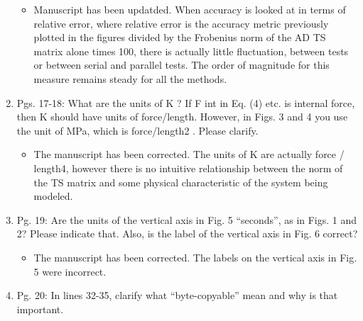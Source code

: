 \documentclass{article}
\begin{document}
\begin{enumerate}
{\color{red}  
\begin{itemize}
     \item
     	Manuscript has been updatded. When accuracy is looked at in terms of relative error, where relative error is the accuracy metric previously plotted in the figures divided by the Frobenius norm of the AD TS matrix alone times 100, there is actually little fluctuation, between tests or between serial and parallel tests. The order of magnitude for this measure remains steady for all the methods.
  \end{itemize}}

  \item
    Pgs. 17-18: What are the units of K ? If F int in Eq. (4) etc. is internal force, then K
    should have units of force/length. However, in Figs. 3 and 4 you use the unit of
    MPa, which is force/length2 . Please clarify.

{\color{red}  
\begin{itemize}
     \item
    The manuscript has been corrected. The units of K are actually force / length4, however there is no intuitive relationship between the norm of the TS matrix and some physical characteristic of the system being modeled.
  \end{itemize}}

    \item
        Pg. 19: Are the units of the vertical axis in Fig. 5 “seconds”, as in Figs. 1 and 2?
        Please indicate that. Also, is the label of the vertical axis in Fig. 6 correct?

{\color{red}  
\begin{itemize}
     \item
        The manuscript has been corrected. The labels on the vertical axis in Fig. 5 were incorrect. 
  \end{itemize}}

\item
Pg. 20: In lines 32-35, clarify what “byte-copyable” mean and why is that important.


\end{enumerate}
\end{document}
